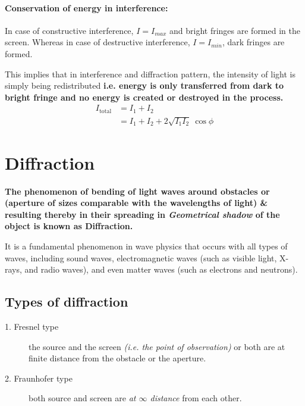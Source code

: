 \documentclass[legalpaper,10pt]{article}
\begin{document}
\begin{multicols*}{2}
	\paragraph*{Conservation of energy in interference:}In case of constructive interference, $I=I_{max}$ and bright fringes are formed in the screen. Whereas in case of destructive interference, $I=I_{min}$, dark fringes are formed.
	\par This implies that in interference and diffraction pattern, the intensity of light is simply being redistributed \textbf{i.e. energy is only transferred from dark to bright fringe and no energy is created or destroyed in the process.}
	\begin{align*}
		I_\text{total} & = I_1 + I_2                             \\
		               & = I_1 + I_2 + 2\sqrt{I_1 I_2}\ \cos\phi
	\end{align*}


	\section*{Diffraction}
	\textbf{The phenomenon of bending of light waves around obstacles or (aperture of sizes comparable with the wavelengths of light) \& resulting thereby in their spreading in \textit{Geometrical shadow} of the object is known as Diffraction.}
	\par It is a fundamental phenomenon in wave physics that occurs with all types of waves, including sound waves, electromagnetic waves (such as visible light, X-rays, and radio waves), and even matter waves (such as electrons and neutrons).
	\subsection*{Types of diffraction}
	\begin{description}
		\item[1. Fresnel type] the source and the screen \textit{(i.e. the point of observation)} or both are at finite distance from the obstacle or the aperture.
		\item[2. Fraunhofer type]  both source and screen are \textit{at $\infty$ distance }from each other.
	\end{description}

\end{multicols*}
\end{document}

